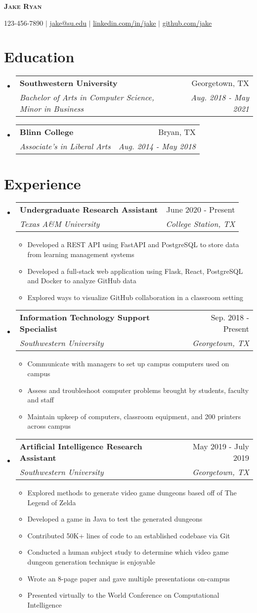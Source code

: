 \documentclass[letterpaper,11pt]{article}%
\makeatletter
\newcommand{\resumeItem}[1]{
  \item\small{
    {#1 \vspace{-2pt}}
  }
}
\newcommand{\resumeSubheading}[4]{
  \vspace{-2pt}\item
    \begin{tabular*}{0.97\textwidth}[t]{l@{\extracolsep{\fill}}r}
      \textbf{#1} & #2 \\
      \textit{\small#3} & \textit{\small #4} \\
    \end{tabular*}\vspace{-7pt}
}
\newcommand{\resumeSubHeadingListStart}{\begin{itemize}[leftmargin=0.15in, label={}]}
\newcommand{\resumeSubHeadingListEnd}{\end{itemize}}
\newcommand{\resumeItemListStart}{\begin{itemize}}
\newcommand{\resumeItemListEnd}{\end{itemize}\vspace{-5pt}}
\makeatother
\begin{document}
%
\normalsize%
\begin{center}%
\textbf{{\Huge \scshape Jake Ryan}}%
\linebreak%
\vspace{1pt}%
\linebreak%
\begin{small}%
123{-}456{-}7890 $|$ \href{mailto:jake@su.edu}{\underline{jake@su.edu}} $|$ \href{https://linkedin.com/in/jake}{\underline{linkedin.com/in/jake}} $|$ \href{https://github.com/jake}{\underline{github.com/jake}}%
\end{small}%
\end{center}%
\section*{Education}%
\label{sec:Education}%
\resumeSubHeadingListStart%
\resumeSubheading{Southwestern University}{Georgetown, TX}{Bachelor of Arts in Computer Science, Minor in Business}{Aug. 2018 {-} May 2021}%
\resumeSubheading{Blinn College}{Bryan, TX}{Associate's in Liberal Arts}{Aug. 2014 {-} May 2018}%
\resumeSubHeadingListEnd

%
\section*{Experience}%
\label{sec:Experience}%
\resumeSubHeadingListStart%
\resumeSubheading{Undergraduate Research Assistant}{June 2020 {-} Present}{Texas A\&M University}{College Station, TX}%
\resumeItemListStart%
\resumeItem{Developed a REST API using FastAPI and PostgreSQL to store data from learning management systems}%
\resumeItem{Developed a full{-}stack web application using Flask, React, PostgreSQL and Docker to analyze GitHub data}%
\resumeItem{Explored ways to visualize GitHub collaboration in a classroom setting}%
\resumeItemListEnd%
\resumeSubheading{Information Technology Support Specialist}{Sep. 2018 {-} Present}{Southwestern University}{Georgetown, TX}%
\resumeItemListStart%
\resumeItem{Communicate with managers to set up campus computers used on campus}%
\resumeItem{Assess and troubleshoot computer problems brought by students, faculty and staff}%
\resumeItem{Maintain upkeep of computers, classroom equipment, and 200 printers across campus}%
\resumeItemListEnd%
\resumeSubheading{Artificial Intelligence Research Assistant}{May 2019 {-} July 2019}{Southwestern University}{Georgetown, TX}%
\resumeItemListStart%
\resumeItem{Explored methods to generate video game dungeons based off of The Legend of Zelda}%
\resumeItem{Developed a game in Java to test the generated dungeons}%
\resumeItem{Contributed 50K+ lines of code to an established codebase via Git}%
\resumeItem{Conducted a human subject study to determine which video game dungeon generation technique is enjoyable}%
\resumeItem{Wrote an 8{-}page paper and gave multiple presentations on{-}campus}%
\resumeItem{Presented virtually to the World Conference on Computational Intelligence}%
\resumeItemListEnd%
\resumeSubHeadingListEnd
\end{document}
